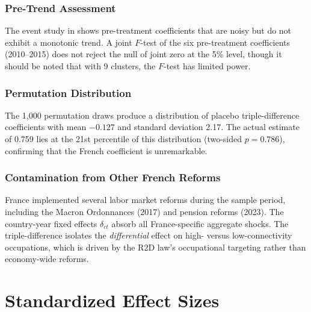 \documentclass[12pt]{article}
\begin{document}
\subsubsection*{Pre-Trend Assessment} The event study in  shows pre-treatment coefficients that are noisy but do not exhibit a monotonic trend. A joint $F$-test of the six pre-treatment coefficients (2010--2015) does not reject the null of joint zero at the 5\% level, though it should be noted that with 9 clusters, the $F$-test has limited power.

\subsubsection*{Permutation Distribution} The 1,000 permutation draws produce a distribution of placebo triple-difference coefficients with mean $-0.127$ and standard deviation 2.17. The actual estimate of 0.759 lies at the 21st percentile of this distribution (two-sided $p = 0.786$), confirming that the French coefficient is unremarkable.

\subsubsection*{Contamination from Other French Reforms} France implemented several labor market reforms during the sample period, including the Macron Ordonnances (2017) and pension reforms (2023). The country-year fixed effects $\delta_{ct}$ absorb all France-specific aggregate shocks. The triple-difference isolates the \textit{differential} effect on high- versus low-connectivity occupations, which is driven by the R2D law's occupational targeting rather than economy-wide reforms.


\section{Standardized Effect Sizes}
\label{sec:sde}


\end{document}
